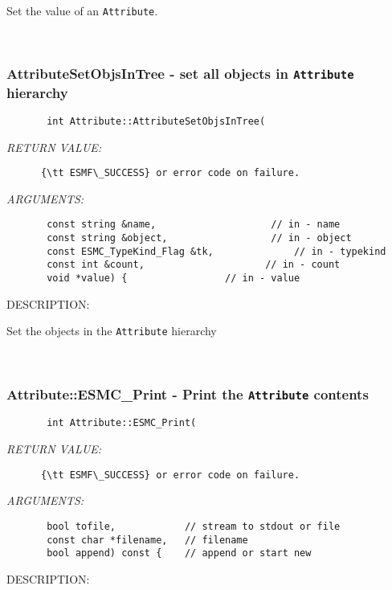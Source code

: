       Set the value of an {\tt Attribute}.
   
 
\mbox{}\hrulefill\
 
\subsubsection [AttributeSetObjsInTree] {AttributeSetObjsInTree - set all objects in {\tt Attribute} hierarchy }


  
\begin{verbatim}       int Attribute::AttributeSetObjsInTree(
   \end{verbatim}{\em RETURN VALUE:}
\begin{verbatim}      {\tt ESMF\_SUCCESS} or error code on failure.
   \end{verbatim}{\em ARGUMENTS:}
\begin{verbatim}       const string &name,                    // in - name
       const string &object,                  // in - object
       const ESMC_TypeKind_Flag &tk,              // in - typekind
       const int &count,                     // in - count
       void *value) {                 // in - value
   \end{verbatim}
{\sf DESCRIPTION:\\ }


       Set the objects in the {\tt Attribute} hierarchy 
  
 
\mbox{}\hrulefill\
 
\subsubsection [Attribute::ESMC\_Print] {Attribute::ESMC\_Print - Print the {\tt Attribute} contents}


  
\begin{verbatim}       int Attribute::ESMC_Print(\end{verbatim}{\em RETURN VALUE:}
\begin{verbatim}      {\tt ESMF\_SUCCESS} or error code on failure.
   \end{verbatim}{\em ARGUMENTS:}
\begin{verbatim}       bool tofile,            // stream to stdout or file
       const char *filename,   // filename
       bool append) const {    // append or start new
   \end{verbatim}
{\sf DESCRIPTION:\\ }


